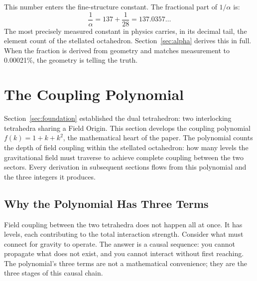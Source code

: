 \documentclass[aps,prd,preprint,superscriptaddress,showpacs,preprintnumbers,amsmath,amssymb,nofootinbib]{revtex4-2}
\begin{document}
This number enters the fine-structure constant. The fractional part of $1/\alpha$ is:
\begin{equation}
\frac{1}{\alpha} = 137 + \frac{1}{28} = 137.0357\ldots
\label{eq:alpha-preview}
\end{equation}
The most precisely measured constant in physics carries, in its decimal tail, the element count of the stellated octahedron. Section~\ref{sec:alpha} derives this in full. When the fraction is derived from geometry and matches measurement to 0.00021\%, the geometry is telling the truth.

\section{The Coupling Polynomial}
\label{sec:polynomial}

Section~\ref{sec:foundation} established the dual tetrahedron: two interlocking tetrahedra sharing a Field Origin. This section develops the coupling polynomial $f(k) = 1 + k + k^2$, the mathematical heart of the paper. The polynomial counts the depth of field coupling within the stellated octahedron: how many levels the gravitational field must traverse to achieve complete coupling between the two sectors. Every derivation in subsequent sections flows from this polynomial and the three integers it produces.

\subsection{Why the Polynomial Has Three Terms}
\label{subsec:hierarchy}

Field coupling between the two tetrahedra does not happen all at once. It has levels, each contributing to the total interaction strength. Consider what must connect for gravity to operate. The answer is a causal sequence: you cannot propagate what does not exist, and you cannot interact without first reaching. The polynomial's three terms are not a mathematical convenience; they are the three stages of this causal chain.
\end{document}
